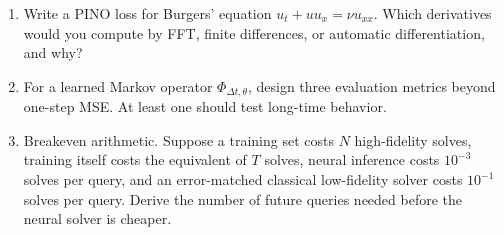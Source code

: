 \documentclass[10pt,a4paper]{article}
\begin{document}
\begin{enumerate}
\item Write a PINO loss for Burgers' equation
$u_t + uu_x = \nu u_{xx}$. Which derivatives would you compute by FFT, finite
differences, or automatic differentiation, and why?

\item For a learned Markov operator $\Phi_{\Delta t,\theta}$, design three
evaluation metrics beyond one-step MSE. At least one should test long-time
behavior.

\item Breakeven arithmetic. Suppose a training set costs $N$ high-fidelity
solves, training itself costs the equivalent of $T$ solves, neural inference
costs $10^{-3}$ solves per query, and an error-matched classical low-fidelity
solver costs $10^{-1}$ solves per query. Derive the number of future queries
needed before the neural solver is cheaper.
\end{enumerate}
\end{document}
